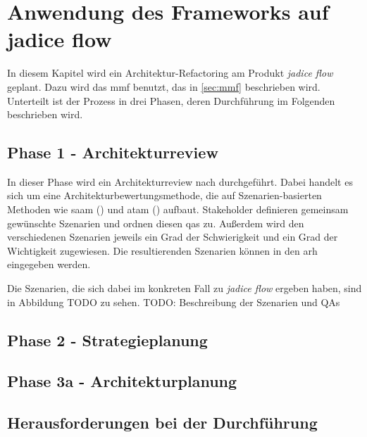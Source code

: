 \chapter{Anwendung des Frameworks auf jadice flow} %
\label{chap:anwendung}

In diesem Kapitel wird ein Architektur-Refactoring am Produkt \emph{jadice flow} geplant.
Dazu wird das \gls{mmf} benutzt, das in \cref{sec:mmf} beschrieben wird.
Unterteilt ist der Prozess in drei Phasen, deren Durchführung im Folgenden beschrieben wird.

\section{Phase 1 - Architekturreview}

In dieser Phase wird ein Architekturreview nach  durchgeführt.
Dabei handelt es sich um eine Architekturbewertungsmethode, die auf Szenarien-basierten Methoden wie \gls{saam} () und \gls{atam} () aufbaut.
Stakeholder definieren gemeinsam gewünschte Szenarien und ordnen diesen \glspl{qa} zu.
Außerdem wird den verschiedenen Szenarien jeweils ein Grad der Schwierigkeit und ein Grad der Wichtigkeit zugewiesen.
Die resultierenden Szenarien können in den \gls{arh} eingegeben werden.

Die Szenarien, die sich dabei im konkreten Fall zu \emph{jadice flow} ergeben haben, sind in Abbildung TODO zu sehen.
TODO: Beschreibung der Szenarien und QAs


\section{Phase 2 - Strategieplanung}
\section{Phase 3a - Architekturplanung}
\section{Herausforderungen bei der Durchführung}
